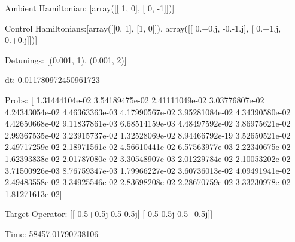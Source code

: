 \documentclass{article}
\begin{document}
    

\newpage

Ambient Hamiltonian: [array([[ 1,  0],
       [ 0, -1]])]

Control Hamiltonians:[array([[0, 1],
       [1, 0]]), array([[ 0.+0.j, -0.-1.j],
       [ 0.+1.j,  0.+0.j]])]

Detunings: [(0.001, 1), (0.001, 2)]

 dt: 0.011780972450961723

Probs: [  1.31444104e-02   3.54189475e-02   2.41111049e-02   3.03776807e-02
   4.24343054e-02   4.46363363e-03   4.17990567e-02   3.95281084e-02
   4.34390580e-02   4.42650668e-02   9.11837861e-03   6.68514159e-03
   4.48497592e-02   3.86975621e-02   2.99367535e-02   3.23915737e-02
   1.32528069e-02   8.94466792e-19   3.52650521e-02   2.49717259e-02
   2.18971561e-02   4.56610441e-02   6.57563977e-03   2.22340675e-02
   1.62393838e-02   2.01787080e-02   3.30548907e-03   2.01229784e-02
   2.10053202e-02   3.71500926e-03   8.76759347e-03   1.79966227e-02
   3.60736013e-02   4.09491941e-02   2.49483558e-02   3.34925546e-02
   2.83698208e-02   2.28670759e-02   3.33230978e-02   1.81271613e-02]

Target Operator: [[ 0.5+0.5j  0.5-0.5j]
 [ 0.5-0.5j  0.5+0.5j]]

Time: 58457.01790738106
\end{document}

